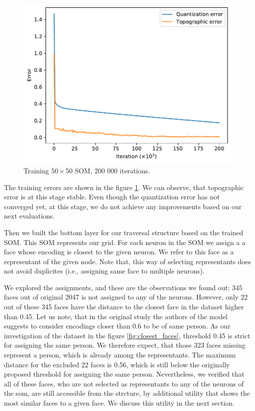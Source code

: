 \begin{figure}
    \centering
    \includegraphics[width=0.8\linewidth]{graphs/som_errors.pdf}
    \caption{Training $50\times50$ SOM, 200 000 iterations.}
    \label{fig:som_training}
\end{figure}

The training errors are shown in the figure \ref{fig:som_training}. We can observe, that topographic error is at this stage stable. Even though the quantization error has not converged yet, at this stage, we do not achieve any improvements based on our next evaluations.

Then we built the bottom layer for our traversal structure based on the trained SOM. This SOM represents our grid. For each neuron in the SOM we assign a a face whose encoding is closest to the given neuron. We refer to this face as a representant of the given node.
Note that, this way of selecting representants does not avoid duplicites (i.e., assigning same face to multiple neurons). 

We explored the assignments, and these are the observations we found out: 345 faces out of original 2047 is not assigned to any of the neurons. However, only 22 out of these 345 faces have the distance to the closest face in the dataset higher than 0.45. Let us note, that in the original study the authors of the model suggests to consider encodings closer than 0.6 to be of same person. As our investigation of the dataset in the figure \ref{fig:closest_faces}, threshold 0.45 is strict for assigning the same person. We therefore expect, that those 323 faces missing represent a person, which is already among the representants. The maximum distance for the excluded 22 faces is 0.56, which is still below the originally proposed threshold for assigning the same person. Nevertheless, we verified that all of these faces, who are not selected as representants to any of the neurons of the \acrshort{som}, are still accessible from the strcture, by additional utility that shows the most similar faces to a given face. We discuss this utility in the next section.

